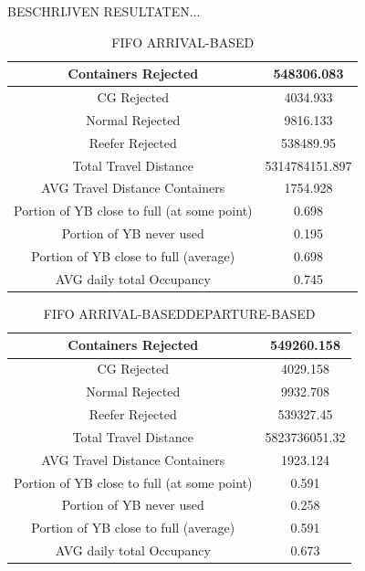 \documentclass{article}
\begin{document}
BESCHRIJVEN RESULTATEN...
\begin{table}[h]
    \centering
    \begin{tabular}{|c|c|}
        \hline
        Containers Rejected                         & 548306.083     \\ \hline
        CG Rejected                                 & 4034.933       \\ \hline
        Normal Rejected                             & 9816.133       \\ \hline
        Reefer Rejected                             & 538489.95      \\ \hline
        Total Travel Distance                       & 5314784151.897 \\ \hline
        AVG Travel Distance Containers              & 1754.928       \\ \hline
        Portion of YB close to full (at some point) & 0.698          \\ \hline
        Portion of YB never used                    & 0.195          \\ \hline
        Portion of YB close to full (average)       & 0.698          \\ \hline
        AVG daily total Occupancy                   & 0.745          \\ \hline
    \end{tabular}
    \caption{FIFO ARRIVAL-BASED}
\end{table}
\begin{table}[h]
    \centering
    \begin{tabular}{|c|c|}
        \hline
        Containers Rejected                         & 549260.158    \\ \hline
        CG Rejected                                 & 4029.158      \\ \hline
        Normal Rejected                             & 9932.708      \\ \hline
        Reefer Rejected                             & 539327.45     \\ \hline
        Total Travel Distance                       & 5823736051.32 \\ \hline
        AVG Travel Distance Containers              & 1923.124      \\ \hline
        Portion of YB close to full (at some point) & 0.591         \\ \hline
        Portion of YB never used                    & 0.258         \\ \hline
        Portion of YB close to full (average)       & 0.591         \\ \hline
        AVG daily total Occupancy                   & 0.673         \\ \hline
    \end{tabular}
    \caption{FIFO ARRIVAL-BASEDDEPARTURE-BASED}
\end{table}
\end{document}
